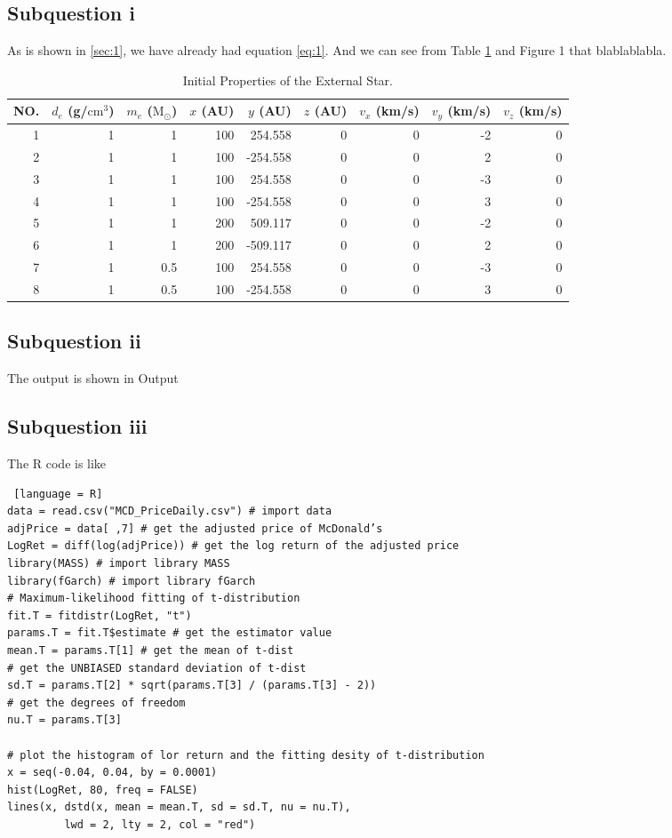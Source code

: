 \documentclass{article}
\DeclareMathOperator{\1}{\mathit{1}}
\numberwithin{figure}{section} %
\begin{document}
\subsection{Subquestion i}
As is shown in \ref{sec:1}, we have already had equation \eqref{eq:1}. And we can see from Table \ref{tab:Parameters_of_Star} and Figure 1 that blablablabla.

	\begin{table}[hbtp]
	\centering
    \caption{\label{tab:Parameters_of_Star}%
    Initial Properties of the External Star.}
    \small
    \begin{tabular}{r|rrrrrrrr}
    \hline\hline
    NO. & $d_e$ (g/$\mathrm{cm}^3$) & $m_e$ ($\mathrm{M}_\odot$) & $x$ (AU) & $y$ (AU) & $z$ (AU) & $v_x$ (km/s) & $v_y$ (km/s) & $v_z$ (km/s) \\ 
    \hline
    1 & 1 & 1 & 100 & 254.558 & 0 & 0 & -2 & 0 \\
    2 & 1 & 1 & 100 & -254.558 & 0 & 0 & 2 & 0 \\
    3 & 1 & 1 & 100 & 254.558 & 0 & 0 & -3 & 0 \\
    4 & 1 & 1 & 100 & -254.558 & 0 & 0 & 3 & 0 \\
    5 & 1 & 1 & 200 & 509.117 & 0 & 0 & -2 & 0 \\
    6 & 1 & 1 & 200 & -509.117 & 0 & 0 & 2 & 0 \\
    7 & 1 & 0.5 & 100 & 254.558 & 0 & 0 & -3 & 0 \\
    8 & 1 & 0.5 & 100 & -254.558 & 0 & 0 & 3 & 0 \\
    \hline\hline
    \end{tabular}
    \end{table}


\subsection{Subquestion ii}
The output is shown in Output 
\subsection{Subquestion iii}

The R code is like

\begin{lstlisting} [language = R]
data = read.csv("MCD_PriceDaily.csv") # import data
adjPrice = data[ ,7] # get the adjusted price of McDonald’s
LogRet = diff(log(adjPrice)) # get the log return of the adjusted price
library(MASS) # import library MASS
library(fGarch) # import library fGarch
# Maximum-likelihood fitting of t-distribution
fit.T = fitdistr(LogRet, "t") 
params.T = fit.T$estimate # get the estimator value
mean.T = params.T[1] # get the mean of t-dist
# get the UNBIASED standard deviation of t-dist
sd.T = params.T[2] * sqrt(params.T[3] / (params.T[3] - 2)) 
# get the degrees of freedom
nu.T = params.T[3]

# plot the histogram of lor return and the fitting desity of t-distribution
x = seq(-0.04, 0.04, by = 0.0001)
hist(LogRet, 80, freq = FALSE)
lines(x, dstd(x, mean = mean.T, sd = sd.T, nu = nu.T),
         lwd = 2, lty = 2, col = "red")
\end{lstlisting}
\end{document}

